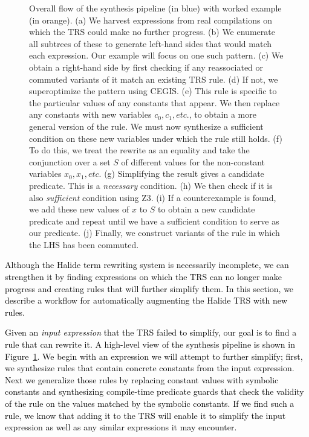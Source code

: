 \documentclass[acmsmall]{acmart}\settopmatter{}
\newcommand{\modified}[1]{\textcolor{black}{{#1}}}
\begin{document}
\begin{figure}
  \caption{Overall flow of the synthesis pipeline (in blue) with worked example (in orange). (a) We harvest expressions from real compilations on which the TRS could make no further progress. (b) We enumerate all subtrees of these to generate left-hand sides that would match each expression. Our example will focus on one such pattern. (c) We obtain a right-hand side by first checking if any reassociated or commuted variants of it match an existing TRS rule. (d) If not, we superoptimize the pattern using CEGIS. (e) This rule is specific to the particular values of any constants that appear. We then replace any constants with new variables $c_0, c_1, etc.$, to obtain a more general version of the rule. We must now synthesize a sufficient condition on these new variables under which the rule still holds. (f) To do this, we treat the rewrite as an equality and take the conjunction over a set $S$ of different values for the non-constant variables $x_0, x_1, etc.$ (g) Simplifying the result gives a candidate predicate. This is a \emph{necessary} condition. (h) We then check if it is also \emph{sufficient} condition using Z3. (i) If a counterexample is found, we add these new values of $x$ to $S$ to obtain a new candidate predicate and repeat until we have a sufficient condition to serve as our predicate. (j) Finally, we construct variants of the rule in which the LHS has been commuted.}
\label{fig:synthesis-flow}
\end{figure}


\modified{Although the Halide term rewriting system is necessarily incomplete, we can strengthen 
it by finding expressions on which the TRS can no longer make progress and creating 
rules that will further simplify them.
In this section, we describe a workflow for automatically augmenting the Halide TRS with new rules.}

\modified{Given an \emph{input expression} that the TRS failed to simplify, our goal is to find a rule that
can rewrite it. A high-level view of the synthesis pipeline is shown in Figure~\ref{fig:synthesis-flow}.
We begin with an expression we will attempt to further simplify; 
first, we synthesize rules that contain concrete constants from the input expression. 
Next we generalize those rules by replacing constant values with symbolic constants and synthesizing compile-time 
predicate guards 
that check the validity of the rule on the values matched by the symbolic constants. If we 
find such a rule, we know that adding it to the TRS will enable it to simplify the input
expression as well as any similar expressions it may encounter.}
\end{document}
